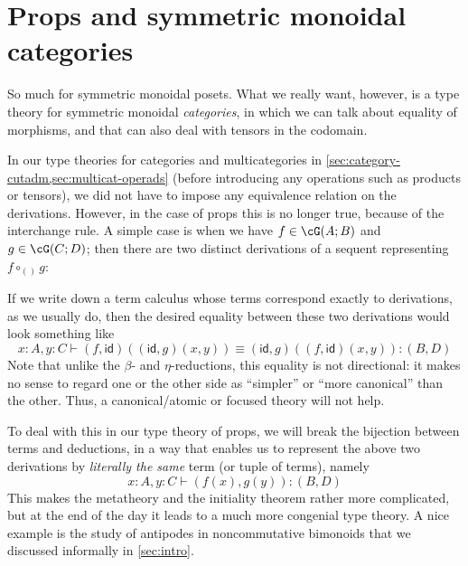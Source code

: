 \documentclass{book}
\def\idfunc{\mathsf{id}}
\let\types\vdash
\begin{document}
\section{Props and symmetric monoidal categories}
\label{sec:prop-smc}

So much for symmetric monoidal posets.
What we really want, however, is a type theory for symmetric monoidal \emph{categories}, in which we can talk about equality of morphisms, and that can also deal with tensors in the codomain.

In our type theories for categories and multicategories in \cref{sec:category-cutadm,sec:multicat-operads} (before introducing any operations such as products or tensors), we did not have to impose any equivalence relation on the derivations.
However, in the case of props this is no longer true, because of the interchange rule.
A simple case is when we have $f\in \cG(A;B)$ and $g\in\cG(C;D)$; then there are two distinct derivations of a sequent representing $f\circ_{()} g$:
If we write down a term calculus whose terms correspond exactly to derivations, as we usually do, then the desired equality between these two derivations would look something like
\[ x:A, y:C \types (f,\idfunc)((\idfunc,g)(x,y)) \equiv (\idfunc,g)((f,\idfunc)(x,y)) : (B,D) \]
Note that unlike the $\beta$- and $\eta$-reductions, this equality is not directional: it makes no sense to regard one or the other side as ``simpler'' or ``more canonical'' than the other.
Thus, a canonical/atomic or focused theory will not help.

To deal with this in our type theory of props, we will break the bijection between terms and deductions, in a way that enables us to represent the above two derivations by \emph{literally the same} term (or tuple of terms), namely
\[ x:A, y:C \types (f(x),g(y)):(B,D) \]
This makes the metatheory and the initiality theorem rather more complicated, but at the end of the day it leads to a much more congenial type theory.
A nice example is the study of antipodes in noncommutative bimonoids that we discussed informally in \cref{sec:intro}.
\end{document}
